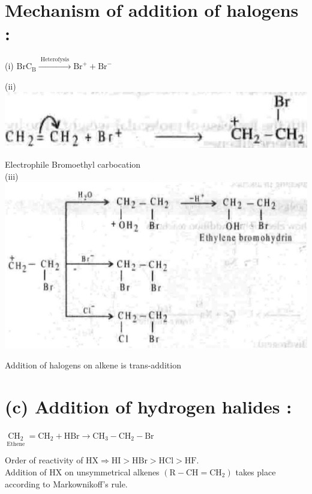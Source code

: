 \documentclass[10pt]{article}
\begin{document}
\section*{Mechanism of addition of halogens :}
(i) $\mathrm{Br} \mathrm{C}_{\mathrm{B}} \xrightarrow{\text { Heterofysis }} \mathrm{Br}^{+}+\mathrm{Br}^{-}$

\begin{displayquote}
(ii)\\
\includegraphics[max width=\textwidth, center]{2025_01_28_8470952b98110cec3aabg-180(2)}
\end{displayquote}

Electrophile Bromoethyl carbocation\\
(iii)\\
\includegraphics[max width=\textwidth, center]{2025_01_28_8470952b98110cec3aabg-180(5)}

Addition of halogens on alkene is trans-addition

\section*{(c) Addition of hydrogen halides :}
$\underset{\text { Ethene }}{\mathrm{CH}_{2}}=\mathrm{CH}_{2}+\mathrm{HBr} \longrightarrow \mathrm{CH}_{3}-\mathrm{CH}_{2}-\mathrm{Br}$

Order of reactivity of $\mathrm{HX} \Rightarrow \mathrm{HI}>\mathrm{HBr}>\mathrm{HCl}>\mathrm{HF}$.\\
Addition of HX on unsymmetrical alkenes $\left(\mathrm{R}-\mathrm{CH}=\mathrm{CH}_{2}\right)$ takes place according to Markownikoff's rule.
\end{document}
